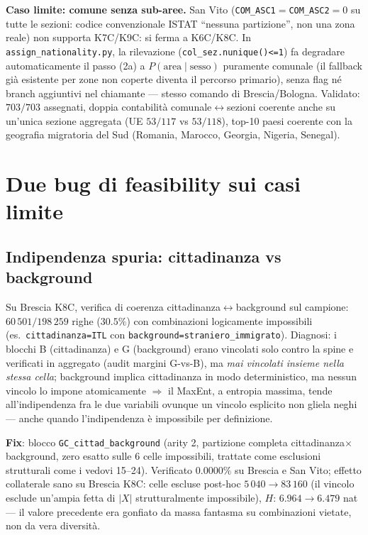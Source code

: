 \documentclass[11pt,a4paper]{article}
\newcommand{\code}[1]{\texttt{#1}}
\begin{document}
\medskip\noindent\textbf{Caso limite: comune senza sub-aree.} San Vito
(\code{COM\_ASC1}$=$\code{COM\_ASC2}$=0$ su tutte le sezioni: codice
convenzionale ISTAT ``nessuna partizione'', non una zona reale) non
supporta K7C/K9C: si ferma a K6C/K8C. In \code{assign\_nationality.py},
la rilevazione (\code{col\_sez.nunique()<=1}) fa degradare
automaticamente il passo (2a) a $P(\text{area}\mid\text{sesso})$
puramente comunale (il fallback gi\`a esistente per zone non coperte
diventa il percorso primario), senza flag n\'e branch aggiuntivi nel
chiamante --- stesso comando di Brescia/Bologna. Validato:
$703/703$ assegnati, doppia contabilit\`a comunale$\leftrightarrow$sezioni
coerente anche su un'unica sezione aggregata (UE $53/117$ vs $53/118$),
top-10 paesi coerente con la geografia migratoria del Sud (Romania,
Marocco, Georgia, Nigeria, Senegal).

\section{Due bug di feasibility sui casi limite}
\label{sec:bugs}

\subsection{Indipendenza spuria: cittadinanza vs background}
\label{sec:bug-gc}
Su Brescia K8C, verifica di coerenza cittadinanza$\leftrightarrow$background
sul campione: $60\,501/198\,259$ righe ($30.5\%$) con combinazioni
logicamente impossibili (es.\ \code{cittadinanza=ITL} con
\code{background=straniero\_immigrato}). Diagnosi: i blocchi B
(cittadinanza) e G (background) erano vincolati solo contro la spine e
verificati in aggregato (audit margini G-vs-B), ma \emph{mai vincolati
insieme nella stessa cella}; background implica cittadinanza in modo
deterministico, ma nessun vincolo lo impone atomicamente $\Rightarrow$ il
MaxEnt, a entropia massima, tende all'indipendenza fra le due variabili
ovunque un vincolo esplicito non gliela neghi --- anche quando
l'indipendenza \`e impossibile per definizione.

\medskip\noindent\textbf{Fix}: blocco \code{GC\_cittad\_background}
(arity 2, partizione completa cittadinanza$\times$background, zero
esatto sulle 6 celle impossibili, trattate come esclusioni strutturali
come i vedovi 15--24). Verificato $0.0000\%$ su Brescia e San Vito;
effetto collaterale sano su Brescia K8C: celle escluse post-hoc
$5\,040\to83\,160$ (il vincolo esclude un'ampia fetta di $|X|$
strutturalmente impossibile), $H$: $6.964\to6.479$ nat --- il valore
precedente era gonfiato da massa fantasma su combinazioni vietate, non
da vera diversit\`a.
\end{document}

